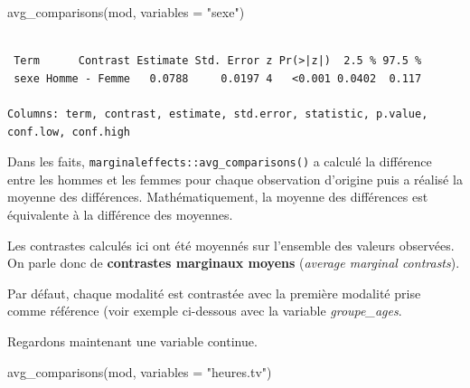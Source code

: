 \documentclass[
  letterpaper,
  DIV=11,
  numbers=noendperiod,
  oneside]{scrreprt}
\newenvironment{Shaded}{\begin{snugshade}}{\end{snugshade}}
\newcommand{\AttributeTok}[1]{\textcolor[rgb]{0.40,0.45,0.13}{#1}}
\newcommand{\FunctionTok}[1]{\textcolor[rgb]{0.28,0.35,0.67}{#1}}
\newcommand{\NormalTok}[1]{\textcolor[rgb]{0.00,0.23,0.31}{#1}}
\newcommand{\StringTok}[1]{\textcolor[rgb]{0.13,0.47,0.30}{#1}}
\begin{document}
\begin{Shaded}
\begin{Highlighting}[]
\FunctionTok{avg\_comparisons}\NormalTok{(mod, }\AttributeTok{variables =} \StringTok{"sexe"}\NormalTok{)}
\end{Highlighting}
\end{Shaded}

\begin{verbatim}

 Term      Contrast Estimate Std. Error z Pr(>|z|)  2.5 % 97.5 %
 sexe Homme - Femme   0.0788     0.0197 4   <0.001 0.0402  0.117

Columns: term, contrast, estimate, std.error, statistic, p.value, conf.low, conf.high 
\end{verbatim}

\begin{tcolorbox}[enhanced jigsaw, colbacktitle=quarto-callout-tip-color!10!white, opacityback=0, toprule=.15mm, colback=white, coltitle=black, bottomtitle=1mm, toptitle=1mm, titlerule=0mm, rightrule=.15mm, title=\textcolor{quarto-callout-tip-color}{\faLightbulb}\hspace{0.5em}{Astuce}, breakable, bottomrule=.15mm, opacitybacktitle=0.6, arc=.35mm, left=2mm, leftrule=.75mm, colframe=quarto-callout-tip-color-frame]

Dans les faits, \texttt{marginaleffects::avg\_comparisons()} a calculé
la différence entre les hommes et les femmes pour chaque observation
d'origine puis a réalisé la moyenne des différences. Mathématiquement,
la moyenne des différences est équivalente à la différence des moyennes.

\end{tcolorbox}

Les contrastes calculés ici ont été moyennés sur l'ensemble des valeurs
observées. On parle donc de \textbf{contrastes marginaux moyens}
(\emph{average marginal contrasts}).

Par défaut, chaque modalité est contrastée avec la première modalité
prise comme référence (voir exemple ci-dessous avec la variable
\emph{groupe\_ages}.

Regardons maintenant une variable continue.

\begin{Shaded}
\begin{Highlighting}[]
\FunctionTok{avg\_comparisons}\NormalTok{(mod, }\AttributeTok{variables =} \StringTok{"heures.tv"}\NormalTok{)}
\end{Highlighting}
\end{Shaded}
\end{document}
